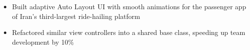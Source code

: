 \begin{itemize}
    \item Built adaptive Auto Layout UI with smooth animations for the passenger app of Iran's third-largest ride-hailing platform
    \item Refactored similar view controllers into a shared base class, speeding up team development by 10\%
\end{itemize}
